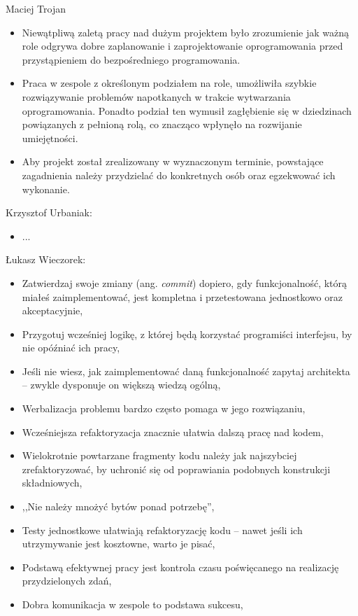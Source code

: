 \begin{description}
\item Maciej Trojan
\begin{itemize}
\item Niewątpliwą zaletą pracy nad dużym projektem było zrozumienie jak ważną role odgrywa
dobre zaplanowanie i zaprojektowanie oprogramowania przed przystąpieniem do bezpośredniego
programowania.
\item Praca w zespole z określonym podziałem na role, umożliwiła szybkie rozwiązywanie
problemów napotkanych w trakcie wytwarzania oprogramowania. Ponadto podział ten wymusił
zagłębienie się w dziedzinach powiązanych z pełnioną rolą, co znacząco wpłynęło na
rozwijanie umiejętności.
\item Aby projekt został zrealizowany w wyznaczonym terminie, powstające zagadnienia należy
przydzielać do konkretnych osób oraz egzekwować ich wykonanie.
\end{itemize}
\item Krzysztof Urbaniak:
\begin{itemize}
\item ...
\end{itemize}
\item Łukasz Wieczorek:
\begin{itemize}
\item Zatwierdzaj swoje zmiany (ang. \emph{commit}) dopiero, gdy funkcjonalność, którą miałeś zaimplementować, jest kompletna i przetestowana jednostkowo oraz akceptacyjnie,
\item Przygotuj wcześniej logikę, z której będą korzystać programiści interfejsu, by nie opóźniać ich pracy,
\item Jeśli nie wiesz, jak zaimplementować daną funkcjonalność zapytaj architekta -- zwykle dysponuje on większą wiedzą ogólną,
\item Werbalizacja problemu bardzo często pomaga w jego rozwiązaniu,
\item Wcześniejsza refaktoryzacja znacznie ułatwia dalszą pracę nad kodem,
\item Wielokrotnie powtarzane fragmenty kodu należy jak najszybciej zrefaktoryzować, by uchronić się od poprawiania podobnych konstrukcji składniowych,
\item ,,Nie należy mnożyć bytów ponad potrzebę'',
\item Testy jednostkowe ułatwiają refaktoryzację kodu -- nawet jeśli ich utrzymywanie jest kosztowne, warto je pisać,
\item Podstawą efektywnej pracy jest kontrola czasu poświęcanego na realizację przydzielonych zdań,
\item Dobra komunikacja w zespole to podstawa sukcesu,
\end{itemize}
\end{description}
